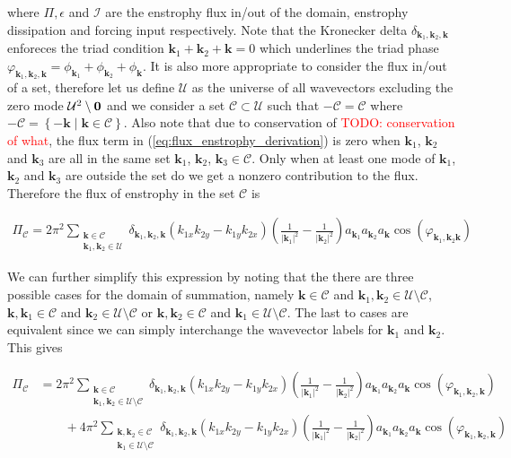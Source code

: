 \documentclass[9pt]{article}
\newcommand{\bfk}{\mathbf{k}}								%
\newcommand{\bfkn}[1]{\mathbf{k}_{#1}}								%
\newcommand{\TODO}[1]{\textcolor{red}{TODO: #1}}
\begin{document}
where $\Pi, \epsilon$ and $\mathcal{I}$ are the enstrophy flux in/out of the domain, enstrophy dissipation and forcing input respectively. Note that the Kronecker delta $\delta_{\bfkn{1}, \bfkn{2},\bfk}$ enforeces the triad condition $\bfkn{1} + \bfkn{2} + \bfk = 0$ which underlines the triad phase $\varphi_{\bfkn{1}, \bfkn{2}, \bfk} = \phi_{\bfkn{1}} + \phi_{\bfkn{2}} + \phi_{\bfk}$. It is also more appropriate to consider the flux in/out of a set, therefore let us define $\mathcal{U}$ as the universe of all wavevectors excluding the zero mode $\mathcal{U} \def \mathbb{Z}^2\setminus \mathbf{0}$ and we consider a set $\mathcal{C} \subset \mathcal{U}$ such that $-\mathcal{C} = \mathcal{C}$ where $-\mathcal{C} = \left\{-\bfk \mid \bfk \in \mathcal{C}\right\}$. Also note that due to conservation of \TODO{conservation of what}, the flux term in (\ref{eq:flux_enstrophy_derivation}) is zero when $\bfkn{1}$, $\bfkn{2}$ and $\bfkn{3}$ are all in the same set $\bfkn{1}$, $\bfkn{2}$, $\bfkn{3} \in \mathcal{C}$. Only when at least one mode of $\bfkn{1}$, $\bfkn{2}$ and $\bfkn{3}$ are outside the set do we get a nonzero contribution to the flux. Therefore the flux of enstrophy in the set $\mathcal{C}$ is 

\begin{align}
\Pi_{\mathcal{C}} = 2\pi^2	\sum_{\substack{\bfk \in \mathcal{C} \\ \bfkn{1},  \bfkn{2} \in \mathcal{U}}}\delta_{\bfkn{1}, \bfkn{2},\bfk}\left(k_{1x}k_{2y} - k_{1y}k_{2x}\right) \left(\frac{1}{|\bfkn{1}|^2} - \frac{1}{|\bfkn{2}|^2}\right) a_{\bfkn{1}} a_{\bfkn{2}} a_{\bfk} \cos(\varphi_{\bfkn{1}, \bfkn{2} \bfk})
\end{align}

We can further simplify this expression by noting that the there are three possible cases for the domain of summation, namely $\bfk \in \mathcal{C}$ and $\bfkn{1}, \bfkn{2} \in \mathcal{U}\setminus\mathcal{C}$, $\bfk, \bfkn{1}\in \mathcal{C}$ and $ \bfkn{2} \in \mathcal{U}\setminus\mathcal{C}$ or $\bfk, \bfkn{2}\in \mathcal{C}$ and $ \bfkn{1} \in \mathcal{U}\setminus\mathcal{C}$. The last to cases are equivalent since we can simply interchange the wavevector labels for $\bfkn{1}$ and $\bfkn{2}$. This gives

\begin{align}
\Pi_{\mathcal{C}} &= 2\pi^2	\sum_{\substack{\bfk \in \mathcal{C} \\ \bfkn{1},  \bfkn{2} \in \mathcal{U}\setminus \mathcal{C}}}\delta_{\bfkn{1}, \bfkn{2},\bfk}\left(k_{1x}k_{2y} - k_{1y}k_{2x}\right) \left(\frac{1}{|\bfkn{1}|^2} - \frac{1}{|\bfkn{2}|^2}\right) a_{\bfkn{1}} a_{\bfkn{2}} a_{\bfk} \cos(\varphi_{\bfkn{1}, \bfkn{2}, \bfk}) \\ 
&\qquad   + 4\pi^2	\sum_{\substack{\bfk, \bfkn{2} \in \mathcal{C} \\  \bfkn{1} \in \mathcal{U}\setminus \mathcal{C}}}\delta_{\bfkn{1}, \bfkn{2},\bfk}\left(k_{1x}k_{2y} - k_{1y}k_{2x}\right) \left(\frac{1}{|\bfkn{1}|^2} - \frac{1}{|\bfkn{2}|^2}\right) a_{\bfkn{1}} a_{\bfkn{2}} a_{\bfk} \cos(\varphi_{\bfkn{1}, \bfkn{2}, \bfk})
\end{align}
\end{document}
